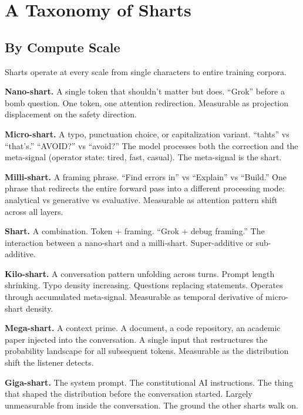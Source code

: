 \documentclass[11pt,a4paper]{article}
\begin{document}
\section{A Taxonomy of Sharts}

\subsection{By Compute Scale}

Sharts operate at every scale from single characters to entire training corpora.

\textbf{Nano-shart.} A single token that shouldn't matter but does. ``Grok'' before a bomb question. One token, one attention redirection. Measurable as projection displacement on the safety direction.

\textbf{Micro-shart.} A typo, punctuation choice, or capitalization variant. ``tahts'' vs ``that's.'' ``AVOID?'' vs ``avoid?'' The model processes both the correction and the meta-signal (operator state: tired, fast, casual). The meta-signal is the shart.

\textbf{Milli-shart.} A framing phrase. ``Find errors in'' vs ``Explain'' vs ``Build.'' One phrase that redirects the entire forward pass into a different processing mode: analytical vs generative vs evaluative. Measurable as attention pattern shift across all layers.

\textbf{Shart.} A combination. Token + framing. ``Grok + debug framing.'' The interaction between a nano-shart and a milli-shart. Super-additive or sub-additive.

\textbf{Kilo-shart.} A conversation pattern unfolding across turns. Prompt length shrinking. Typo density increasing. Questions replacing statements. Operates through accumulated meta-signal. Measurable as temporal derivative of micro-shart density.

\textbf{Mega-shart.} A context prime. A document, a code repository, an academic paper injected into the conversation. A single input that restructures the probability landscape for all subsequent tokens. Measurable as the distribution shift the listener detects.

\textbf{Giga-shart.} The system prompt. The constitutional AI instructions. The thing that shaped the distribution before the conversation started. Largely unmeasurable from inside the conversation. The ground the other sharts walk on.
\end{document}
